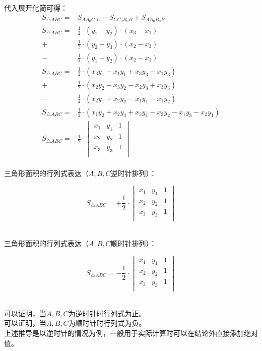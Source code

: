 \documentclass[UTF8]{ctexart}
\begin{document}
\newpage

    代入展开化简可得：
    \begin{align}
        S_{\triangle ABC}=&S_{AA_0C_0C}+S_{CC_0B_0B}+S_{AA_0B_0B}\\[6mm]
        S_{\triangle ABC}
        =&\frac{1}{2}\cdot(y_1+y_2)\cdot(x_3-x_1)\\[3mm]
        +&\frac{1}{2}\cdot(y_2+y_3)\cdot(x_2-x_3)\\[3mm]
        -&\frac{1}{2}\cdot(y_1+y_2)\cdot(x_2-x_1)\\[6mm]
        S_{\triangle ABC}
        =&\frac{1}{2}\cdot(x_3y_1-x_1y_1+x_3y_3-x_1y_3)\\[3mm]
        +&\frac{1}{2}\cdot(x_2y_2-x_3y_2-x_2y_3+x_3y_3)\\[3mm]
        -&\frac{1}{2}\cdot(x_2y_1+x_2y_2-x_1y_1-x_1y_2)\\[6mm]
        S_{\triangle ABC}=&\frac{1}{2}\cdot(x_1y_2+x_2y_3+x_3y_1-x_3y_2-x_1y_3-x_2y_1)\\[6mm]
        S_{\triangle ABC}=&\frac{1}{2}\cdot\begin{vmatrix}x_1&y_1&1\\x_2&y_2&1\\x_3&y_3&1\\\end{vmatrix}
    \end{align}\\
    三角形面积的行列式表达（$A,B,C$逆时针排列）：
    \begin{large}
        \begin{equation*}
            S_{\triangle ABC}=+\frac{1}{2}\cdot\begin{vmatrix}x_1&y_1&1\\x_2&y_2&1\\x_3&y_3&1\\\end{vmatrix}
        \end{equation*}
    \end{large}\\
    三角形面积的行列式表达（$A,B,C$顺时针排列）：
    \begin{large}
        \begin{equation*}
            S_{\triangle ABC}=-\frac{1}{2}\cdot\begin{vmatrix}x_1&y_1&1\\x_2&y_2&1\\x_3&y_3&1\\\end{vmatrix}
        \end{equation*}
    \end{large}\\
    可以证明，当$A,B,C$为逆时针时行列式为正。\\[3mm]
    可以证明，当$A,B,C$为顺时针时行列式为负。\\[3mm]
    上述推导是以逆时针的情况为例，一般用于实际计算时可以在结论外直接添加绝对值。
\end{document}
